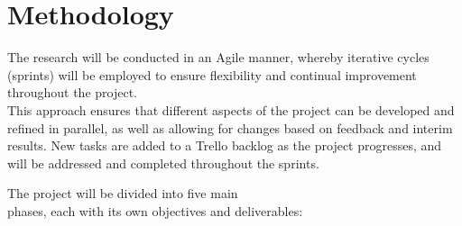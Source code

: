\documentclass[english]{hogent-article}
\begin{document}
\section{Methodology}
\label{sec:methodology}

The research will be conducted in an Agile manner, whereby iterative cycles (sprints) will be employed 
to ensure flexibility and continual improvement throughout the project.\\
This approach ensures that different aspects of the project can be developed and refined in parallel, 
as well as allowing for changes based on feedback and interim results.
New tasks are added to a Trello backlog as the project progresses, and will be addressed and completed throughout the sprints.

The project will be divided into five main\\ phases, each with its own objectives and deliverables: 
\end{document}
